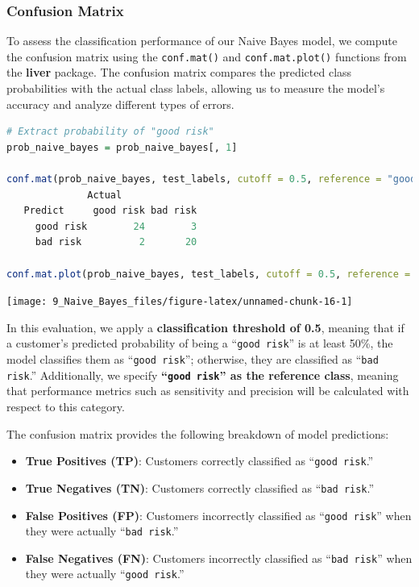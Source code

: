 \documentclass[
  11pt,
]{book}
\newcommand{\passthrough}[1]{#1}
\providecommand{\tightlist}{%
  \setlength{\itemsep}{0pt}\setlength{\parskip}{0pt}}
\theoremstyle{definition}
\theoremstyle{definition}
\theoremstyle{definition}
\theoremstyle{definition}
\theoremstyle{remark}
\begin{document}
\subsubsection*{Confusion Matrix}\label{confusion-matrix-1}


To assess the classification performance of our Naive Bayes model, we compute the confusion matrix using the \passthrough{\lstinline!conf.mat()!} and \passthrough{\lstinline!conf.mat.plot()!} functions from the \textbf{liver} package. The confusion matrix compares the predicted class probabilities with the actual class labels, allowing us to measure the model's accuracy and analyze different types of errors.

\begin{lstlisting}[language=R]
# Extract probability of "good risk"
prob_naive_bayes = prob_naive_bayes[, 1] 

conf.mat(prob_naive_bayes, test_labels, cutoff = 0.5, reference = "good risk")
              Actual
   Predict     good risk bad risk
     good risk        24        3
     bad risk          2       20

conf.mat.plot(prob_naive_bayes, test_labels, cutoff = 0.5, reference = "good risk")
\end{lstlisting}

\begin{center}\texttt{[image: 9\_Naive\_Bayes\_files/figure-latex/unnamed-chunk-16-1]} \end{center}

In this evaluation, we apply a \textbf{classification threshold of 0.5}, meaning that if a customer's predicted probability of being a ``\passthrough{\lstinline!good risk!}'' is at least 50\%, the model classifies them as ``\passthrough{\lstinline!good risk!}''; otherwise, they are classified as ``\passthrough{\lstinline!bad risk!}.'' Additionally, we specify \textbf{``\passthrough{\lstinline!good risk!}'' as the reference class}, meaning that performance metrics such as sensitivity and precision will be calculated with respect to this category.

The confusion matrix provides the following breakdown of model predictions:

\begin{itemize}
\tightlist
\item
  \textbf{True Positives (TP)}: Customers correctly classified as ``\passthrough{\lstinline!good risk!}.''\\
\item
  \textbf{True Negatives (TN)}: Customers correctly classified as ``\passthrough{\lstinline!bad risk!}.''\\
\item
  \textbf{False Positives (FP)}: Customers incorrectly classified as ``\passthrough{\lstinline!good risk!}'' when they were actually ``\passthrough{\lstinline!bad risk!}.''\\
\item
  \textbf{False Negatives (FN)}: Customers incorrectly classified as ``\passthrough{\lstinline!bad risk!}'' when they were actually ``\passthrough{\lstinline!good risk!}.''
\end{itemize}
\end{document}
